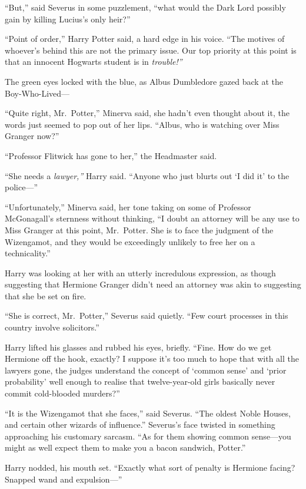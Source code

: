 ``But,'' said Severus in some puzzlement, ``what would the Dark Lord
possibly gain by killing Lucius's only heir?''

``Point of order,'' Harry Potter said, a hard edge in his voice. ``The
motives of whoever's behind this are not the primary issue. Our top
priority at this point is that an innocent Hogwarts student is in
\emph{trouble!''}

The green eyes locked with the blue, as Albus Dumbledore gazed back at
the Boy-Who-Lived---

``Quite right, Mr.~Potter,'' Minerva said, she hadn't even thought about
it, the words just seemed to pop out of her lips. ``Albus, who is
watching over Miss Granger now?''

``Professor Flitwick has gone to her,'' the Headmaster said.

``She needs a \emph{lawyer,''} Harry said. ``Anyone who just blurts out
`I did it' to the police---''

``Unfortunately,'' Minerva said, her tone taking on some of Professor
McGonagall's sternness without thinking, ``I doubt an attorney will be
any use to Miss Granger at this point, Mr.~Potter. She is to face the
judgment of the Wizengamot, and they would be exceedingly unlikely to
free her on a technicality.''

Harry was looking at her with an utterly incredulous expression, as
though suggesting that Hermione Granger didn't need an attorney was akin
to suggesting that she be set on fire.

``She is correct, Mr.~Potter,'' Severus said quietly. ``Few court
processes in this country involve solicitors.''

Harry lifted his glasses and rubbed his eyes, briefly. ``Fine. How do we
get Hermione off the hook, exactly? I suppose it's too much to hope that
with all the lawyers gone, the judges understand the concept of `common
sense' and `prior probability' well enough to realise that
twelve-year-old girls basically never commit cold-blooded murders?''

``It is the Wizengamot that she faces,'' said Severus. ``The oldest
Noble Houses, and certain other wizards of influence.'' Severus's face
twisted in something approaching his customary sarcasm. ``As for them
showing common sense---you might as well expect them to make you a bacon
sandwich, Potter.''

Harry nodded, his mouth set. ``Exactly what sort of penalty is Hermione
facing? Snapped wand and expulsion---''

